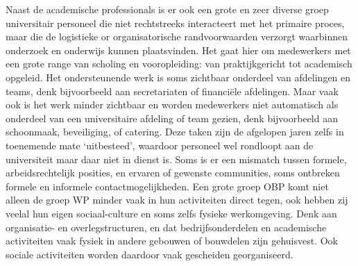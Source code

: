\documentclass[empirical, authordate, ]{new-jote-article}
\begin{document}
	Naast de academische professionals is er ook een grote en zeer diverse groep universitair personeel die niet rechtstreeks interacteert met het primaire proces, maar die de logistieke or organisatorische randvoorwaarden verzorgt waarbinnen onderzoek en onderwijs kunnen plaatsvinden. Het gaat hier om medewerkers met een grote range van scholing en vooropleiding: van praktijkgericht tot academisch opgeleid. Het ondersteunende werk is soms zichtbaar onderdeel van afdelingen en teams, denk bijvoorbeeld aan secretariaten of financiële afdelingen. Maar vaak ook is het werk minder zichtbaar en worden medewerkers niet automatisch als onderdeel van een universitaire afdeling of team gezien, denk bijvoorbeeld aan schoonmaak, beveiliging, of catering. Deze taken zijn de afgelopen jaren zelfs in toenemende mate ‘uitbesteed', waardoor personeel wel rondloopt aan de universiteit maar daar niet in dienst is. Soms is er een mismatch tussen formele, arbeidsrechtelijk posities, en ervaren of gewenste communities, soms ontbreken formele en informele contactmogelijkheden. Een grote groep OBP komt niet alleen de groep WP minder vaak in hun activiteiten direct tegen, ook hebben zij veelal hun eigen sociaal-culture en soms zelfs fysieke werkomgeving. Denk aan organisatie- en overlegstructuren, en dat bedrijfsonderdelen en academische activiteiten vaak fysiek in andere gebouwen of bouwdelen zijn gehuisvest. Ook sociale activiteiten worden daardoor vaak gescheiden georganiseerd.
\end{document}
